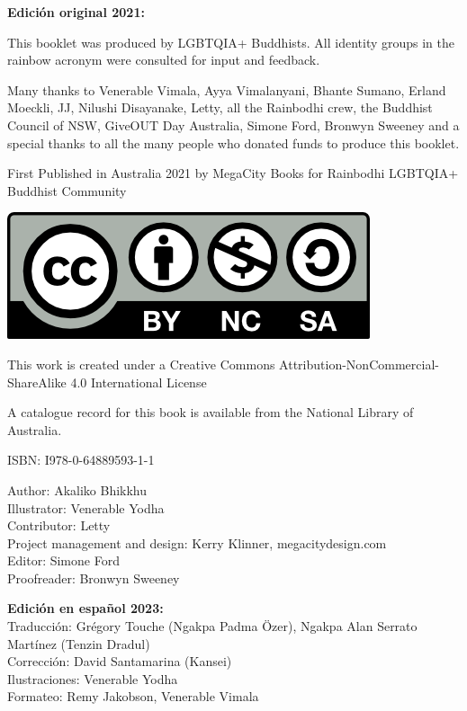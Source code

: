 \documentclass[12pt,openany]{book}
\begin{document}
{\footnotesize
\begin{center}
\noindent \textbf{Edición original 2021:}

This booklet was produced by LGBTQIA+ Buddhists. All identity groups in the rainbow acronym were consulted for input and feedback.

\noindent Many thanks to Venerable Vimala, Ayya Vimalanyani, Bhante Sumano, Erland Moeckli, JJ, Nilushi Disayanake, Letty, all the Rainbodhi crew, the Buddhist Council of NSW, GiveOUT Day Australia, Simone Ford, Bronwyn Sweeney and a special thanks to all the many people who donated funds to produce this booklet.

\medskip

\noindent First Published in Australia 2021 by MegaCity Books for Rainbodhi LGBTQIA+ Buddhist Community

\smallskip

\includegraphics{by-nc-sa}

\noindent This work is created under a Creative Commons Attribution-NonCommercial-ShareAlike 4.0 International License

\noindent A catalogue record for this book is available from the National Library of Australia.

\medskip

\noindent ISBN: I978-0-64889593-1-1

\medskip

Author: Akaliko Bhikkhu \\
Illustrator: Venerable Yodha \\
Contributor: Letty \\
Project management and design: Kerry Klinner, megacitydesign.com \\
Editor: Simone Ford \\
Proofreader: Bronwyn Sweeney

\bigskip

\textbf{Edición en español 2023:}  \\
Traducción: Grégory Touche (Ngakpa Padma Özer), Ngakpa Alan Serrato Martínez (Tenzin Dradul) \\
Corrección: David Santamarina (Kansei) \\
Ilustraciones: Venerable Yodha \\
Formateo: Remy Jakobson, Venerable Vimala
\end{center}
}
\end{document}
